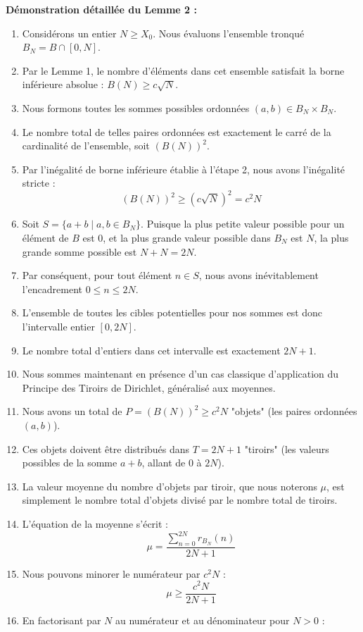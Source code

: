 \documentclass[12pt,a4paper]{article}
\begin{document}
\textbf{Démonstration détaillée du Lemme 2 :}
\begin{enumerate}
    \item Considérons un entier $N \ge X_0$. Nous évaluons l'ensemble tronqué $B_N = B \cap [0, N]$.
    \item Par le Lemme 1, le nombre d'éléments dans cet ensemble satisfait la borne inférieure absolue : $B(N) \ge c \sqrt{N}$.
    \item Nous formons toutes les sommes possibles ordonnées $(a, b) \in B_N \times B_N$.
    \item Le nombre total de telles paires ordonnées est exactement le carré de la cardinalité de l'ensemble, soit $(B(N))^2$.
    \item Par l'inégalité de borne inférieure établie à l'étape 2, nous avons l'inégalité stricte :
    $$(B(N))^2 \ge (c \sqrt{N})^2 = c^2 N$$
    \item Soit $S = \{a + b \mid a, b \in B_N\}$. Puisque la plus petite valeur possible pour un élément de $B$ est 0, et la plus grande valeur possible dans $B_N$ est $N$, la plus grande somme possible est $N + N = 2N$.
    \item Par conséquent, pour tout élément $n \in S$, nous avons inévitablement l'encadrement $0 \le n \le 2N$.
    \item L'ensemble de toutes les cibles potentielles pour nos sommes est donc l'intervalle entier $[0, 2N]$.
    \item Le nombre total d'entiers dans cet intervalle est exactement $2N + 1$.
    \item Nous sommes maintenant en présence d'un cas classique d'application du Principe des Tiroirs de Dirichlet, généralisé aux moyennes.
    \item Nous avons un total de $P = (B(N))^2 \ge c^2 N$ "objets" (les paires ordonnées $(a, b)$).
    \item Ces objets doivent être distribués dans $T = 2N + 1$ "tiroirs" (les valeurs possibles de la somme $a + b$, allant de 0 à $2N$).
    \item La valeur moyenne du nombre d'objets par tiroir, que nous noterons $\mu$, est simplement le nombre total d'objets divisé par le nombre total de tiroirs.
    \item L'équation de la moyenne s'écrit :
    $$\mu = \frac{\sum_{n=0}^{2N} r_{B_N}(n)}{2N + 1}$$
    \item Nous pouvons minorer le numérateur par $c^2 N$ :
    $$\mu \ge \frac{c^2 N}{2N + 1}$$
    \item En factorisant par $N$ au numérateur et au dénominateur pour $N > 0$ :

\end{enumerate}
\end{document}
